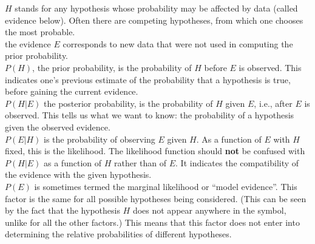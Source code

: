 \documentclass[11pt]{article}
\begin{document}
\noindent
$H$ stands for any hypothesis whose probability may be affected by
data (called evidence below). Often there are competing hypotheses,
from which one chooses the most probable.\\

\noindent
the evidence $E$ corresponds to new data that were not used in
computing the prior probability.\\

\noindent
$P(H)$, the prior probability, is the probability of $H$ before $E$ is
observed. This indicates one's previous estimate of the probability
that a hypothesis is true, before gaining the current evidence.\\

\noindent
$P(H | E)$ the posterior probability, is the probability of $H$ given
$E$, i.e., after $E$ is observed. This tells us what we want to know:
the probability of a hypothesis given the observed evidence.\\

\noindent
$P (E | H)$ is the probability of observing $E$ given $H$. As a
function of $E$ with $H$ fixed, this is the likelihood. The likelihood
function should {\bf not} be confused with $P(H | E)$ as a function of 
$H$ rather than of $E$. It indicates the compatibility of the evidence with the given
hypothesis.\\

\noindent
$P(E)$ is sometimes termed the marginal likelihood or ``model
evidence''. This factor is the same for all possible hypotheses being
considered. (This can be seen by the fact that the hypothesis $H$ does
not appear anywhere in the symbol, unlike for all the other factors.)
This means that this factor does not enter into determining the
relative probabilities of different hypotheses. \\


\end{document}

